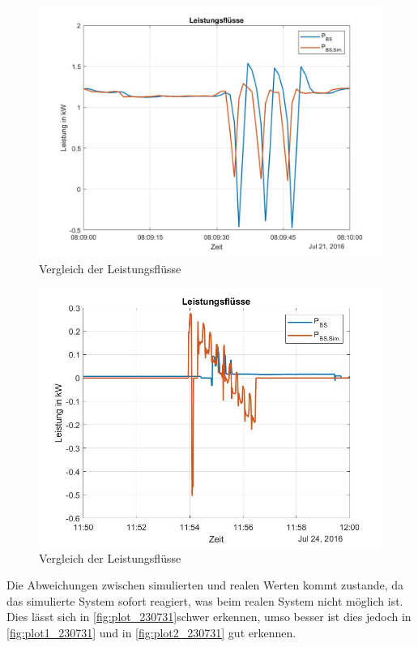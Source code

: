 \begin{figure}[H]
    \centering
    \includegraphics[width=\textwidth]{Abbildungen/8.09.jpg}
    \caption{Vergleich der Leistungsflüsse}
    \label{fig:plot1_230731}
\end{figure}

\begin{figure}[H]
    \centering
    \includegraphics[width=\textwidth]{Abbildungen/11.54.jpg}
    \caption{Vergleich der Leistungsflüsse}
    \label{fig:plot2_230731}
\end{figure}
Die Abweichungen zwischen simulierten und realen Werten kommt zustande, da das simulierte System sofort reagiert, was beim realen System nicht möglich ist. Dies lässt sich in \autoref{fig:plot_230731}schwer erkennen, umso besser ist dies jedoch in  \autoref{fig:plot1_230731} und in \autoref{fig:plot2_230731} gut erkennen.
\newpage

